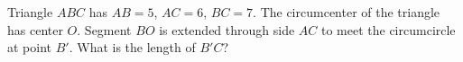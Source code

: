 Triangle $ABC$ has $AB = 5$, $AC = 6$, $BC = 7$. The circumcenter of the triangle has center $O$. Segment $BO$ is extended through side $AC$ to meet the circumcircle at point $B'$. What is the length of $B'C$?
